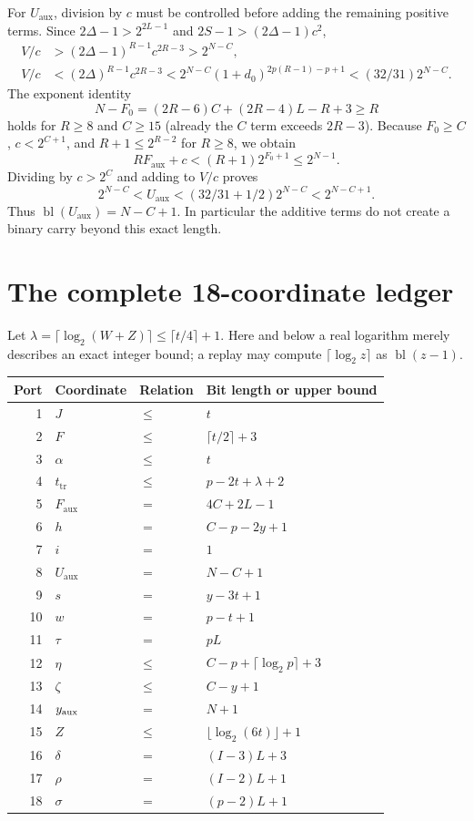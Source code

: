 \documentclass[11pt,letterpaper]{article}
\theoremstyle{definition}\newtheorem{definition}[theorem]{Definition}
\theoremstyle{remark}\newtheorem{remark}[theorem]{Remark}
\newcommand{\D}{\Delta}
\newcommand{\Fa}{F_{\mathrm{aux}}}\newcommand{\Ua}{U_{\mathrm{aux}}}\newcommand{\ttt}{t_{\mathrm{tr}}}
\newcommand{\bl}{\operatorname{bl}}
\begin{document}
For $\Ua$, division by $c$ must be controlled before adding the
remaining positive terms. Since
$2\D-1>2^{2L-1}$ and $2S-1>(2\D-1)c^2$,
\begin{align*}
 V/c&>(2\D-1)^{R-1}c^{2R-3}>2^{N-C},\\
 V/c&<(2\D)^{R-1}c^{2R-3}
 <2^{N-C}(1+d_0)^{2p(R-1)-p+1}<(32/31)2^{N-C}.
\end{align*}
The exponent identity
\begin{equation}\label{fup:eh:eq:gap}
 N-F_0=(2R-6)C+(2R-4)L-R+3\ge R
\end{equation}
holds for $R\ge8$ and $C\ge15$ (already the $C$ term exceeds
$2R-3$). Because $F_0\ge C$, $c<2^{C+1}$, and
$R+1\le2^{R-2}$ for $R\ge8$, we obtain
\[
 R\Fa+c<(R+1)2^{F_0+1}\le2^{N-1}.
\]
Dividing by $c>2^C$ and adding to $V/c$ proves
\begin{equation}\label{fup:eh:eq:Ubound}
 2^{N-C}<\Ua<(32/31+1/2)2^{N-C}<2^{N-C+1}.
\end{equation}
Thus $\bl(\Ua)=N-C+1$. In particular the additive terms do not
create a binary carry beyond this exact length.

\section{The complete 18-coordinate ledger}
\label{fup:eh:sec:ledger}
Let $\lambda=\lceil\log_2(W+Z)\rceil\le\lceil t/4\rceil+1$.
Here and below a real logarithm merely describes an exact integer
bound; a replay may compute $\lceil\log_2z\rceil$ as $\bl(z-1)$.
\begin{center}
\begin{tabular}{rll@{\qquad}l}
\toprule
Port&Coordinate&Relation&Bit length or upper bound\\
\midrule
1&$J$&$\le$&$t$\\
2&$F$&$\le$&$\lceil t/2\rceil+3$\\
3&$\alpha$&$\le$&$t$\\
4&$\ttt$&$\le$&$p-2t+\lambda+2$\\
5&$\Fa$&$=$&$4C+2L-1$\\
6&$h$&$=$&$C-p-2y+1$\\
7&$i$&$=$&$1$\\
8&$\Ua$&$=$&$N-C+1$\\
9&$s$&$=$&$y-3t+1$\\
10&$w$&$=$&$p-t+1$\\
11&$\tau$&$=$&$pL$\\
12&$\eta$&$\le$&$C-p+\lceil\log_2p\rceil+3$\\
13&$\zeta$&$\le$&$C-y+1$\\
14&$y_{\mathrm{aux}}$&$=$&$N+1$\\
15&$Z$&$\le$&$\lfloor\log_2(6t)\rfloor+1$\\
16&$\delta$&$=$&$(I-3)L+3$\\
17&$\rho$&$=$&$(I-2)L+1$\\
18&$\sigma$&$=$&$(p-2)L+1$\\
\bottomrule
\end{tabular}
\end{center}
\end{document}
